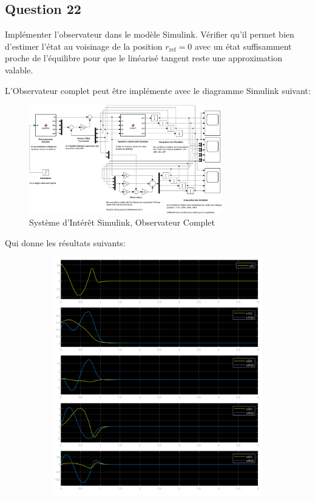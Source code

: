 \documentclass[class=article, crop=false]{standalone}
\begin{document}
\newpage
\subsection{Question 22}
\begin{exercise}
    Implémenter l'observateur dans le modèle Simulink. Vérifier qu'il permet bien d'estimer l'état au voisinage de la position $r_{\text{ref}} = 0$ avec un état suffisamment proche de l'équilibre pour que le linéarisé tangent reste une approximation valable.
\end{exercise}
\begin{resolution}
    L'Observateur complet peut être implémente avec le diagramme Simulink suivant:
    \begin{figure}[H]
        \centering
        \includegraphics[width=0.75\textwidth]{../images/system_simulink_4.png}
        \caption{Système d'Intérêt Simulink, Observateur Complet}
    \end{figure}
    Qui donne les résultats suivants:
    \begin{figure}[H]
        \centering
        \begin{subfigure}[b]{0.45\textwidth}
            \centering
            \includegraphics[width=\textwidth]{../images/m4_r0_s0.6_o0.4.png}

\end{subfigure}
\end{figure}
\end{resolution}
\end{document}
